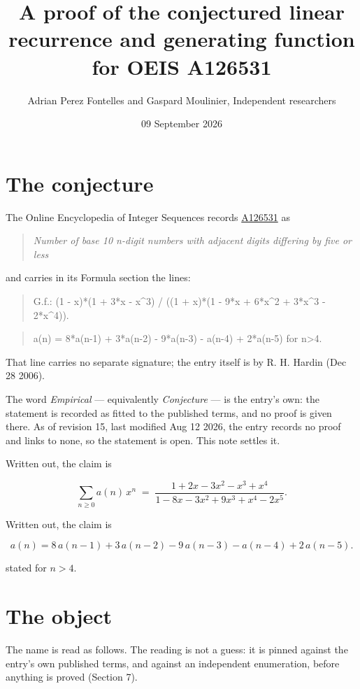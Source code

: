 \documentclass[11pt]{article}
\title{A proof of the conjectured linear recurrence and generating function for OEIS A126531}
\author{Adrian Perez Fontelles and Gaspard Moulinier, Independent researchers}
\date{09 September 2026}
\theoremstyle{definition}
\begin{document}
\maketitle
\section{The conjecture}

The Online Encyclopedia of Integer Sequences records \href{https://oeis.org/A126531}{A126531} as

\begin{quote}\itshape Number of base 10 n-digit numbers with adjacent digits differing by five or less\end{quote}

and carries in its Formula section the lines:

\begin{quote}\ttfamily G.f.: (1 - x)*(1 + 3*x - x\textasciicircum{}3) / ((1 + x)*(1 - 9*x + 6*x\textasciicircum{}2 + 3*x\textasciicircum{}3 - 2*x\textasciicircum{}4)).\end{quote}

\begin{quote}\ttfamily a(n) = 8*a(n-1) + 3*a(n-2) - 9*a(n-3) - a(n-4) + 2*a(n-5) for n>4.\end{quote}

That line carries no separate signature; the entry itself is by R. H. Hardin (Dec 28 2006).

The word {\itshape Empirical} --- equivalently {\itshape Conjecture} --- is the entry's own: the statement is recorded as fitted to the published terms, and no proof is given there. As of revision 15, last modified Aug 12 2026, the entry records no proof and links to none, so the statement is open. This note settles it.

Written out, the claim is

\[\sum_{n \ge 0} a(n)\,x^n \;=\; \frac{1 + 2x - 3x^{2} - x^{3} + x^{4}}{1 - 8x - 3x^{2} + 9x^{3} + x^{4} - 2x^{5}}.\]

Written out, the claim is

\[a(n) = 8\,a(n-1) + 3\,a(n-2) - 9\,a(n-3) - a(n-4) + 2\,a(n-5).\]

stated for $n > 4$.

\section{The object}

The name is read as follows. The reading is not a guess: it is pinned against the entry's own published terms, and against an independent enumeration, before anything is proved (Section 7).
\end{document}
